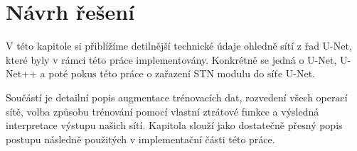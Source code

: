 \chapter{Návrh řešení}
\label{sec:Chapter4}
V této kapitole si přiblížíme detilnější technické údaje ohledně sítí z řad U-Net, které byly v rámci této práce implementovány. Konkrétně se jedná o U-Net, U-Net++ a poté pokus této práce o zařazení STN modulu do síťe U-Net.

Součástí je detailní popis augmentace trénovacích dat, rozvedení všech operací sítě, volba způsobu trénování pomocí vlastní ztrátové funkce a výsledná interpretace výstupu našich sítí. Kapitola slouží jako dostatečně přesný popis postupu následně použitých v implementační části této práce.
\endinput